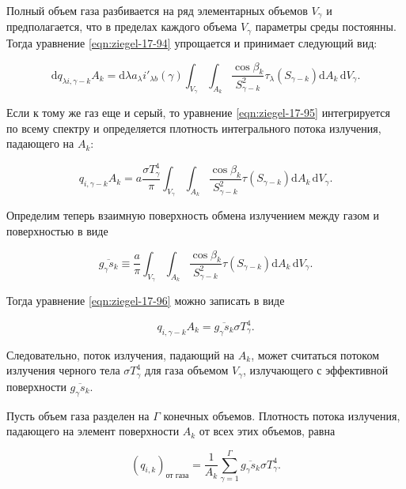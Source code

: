 \noindent Полный объем газа разбивается на ряд элементарных объемов
$V_\gamma$ и предполагается, что в пределах каждого объема $V_\gamma$
параметры среды постоянны. Тогда уравнение \eqref{eqn:ziegel-17-94} упрощается
и принимает следующий вид:

\begin{equation}
	\label{eqn:ziegel-17-95}
	\mathrm dq_{\lambda i, \gamma - k}A_k = \mathrm d\lambda a_\lambda i'_{\lambda b}(\gamma)  \int_{V_\gamma} \int_{A_k} \frac{\cos{\beta_k}}{S^2_{\gamma-k}}
	\tau_\lambda (S_{\gamma - k}) \mathrm dA_k \, \mathrm dV_\gamma.
\end{equation}

\noindent Если к тому же газ еще и серый, то уравнение \eqref{eqn:ziegel-17-95}
интегрируется по всему спектру и определяется плотность интегрального
потока излучения, падающего на $A_k$:

\begin{equation}
	\label{eqn:ziegel-17-96}
	q_{i, \gamma - k}A_k = a\frac{\sigma T^4_\gamma}{\pi} \int_{V_\gamma} \int_{A_k} \frac{\cos{\beta_k}}{S^2_{\gamma-k}}
	\tau (S_{\gamma - k}) \mathrm dA_k \, \mathrm dV_\gamma.
\end{equation}

Определим теперь взаимную поверхность обмена излучением
между газом и поверхностью в виде

\begin{equation}
	\label{eqn:ziegel-17-97}
	\overline{g_\gamma s_k} \equiv \frac a\pi  \int_{V_\gamma} \int_{A_k} \frac{\cos{\beta_k}}{S^2_{\gamma-k}}
	\tau (S_{\gamma - k}) \mathrm dA_k \, \mathrm dV_\gamma.
\end{equation}

\noindent Тогда уравнение \eqref{eqn:ziegel-17-96} можно записать в виде

\begin{equation}
	q_{i, \gamma - k} A_k = \overline{g_\gamma s_k} \sigma T^4_\gamma.
\end{equation}

\noindent Следовательно, поток излучения, падающий на $A_k$, может
считаться потоком излучения черного тела $\sigma T^4_\gamma$ для газа объемом
$V_\gamma$, излучающего с эффективной поверхности $\overline{g_\gamma s_k}$.

Пусть объем газа разделен на $\Gamma$ конечных объемов. Плотность
потока излучения, падающего на элемент поверхности $A_k$ от всех
этих объемов, равна

\begin{equation}
	(q_{i, k})_{\text{от газа}} = \frac{1}{A_k} \sum_{\gamma = 1}^{\Gamma} \overline{g_\gamma s_k} \sigma T^4_\gamma.
\end{equation}

